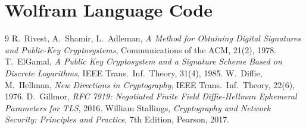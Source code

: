 \documentclass[12pt,a4paper]{article}
\begin{document}
\appendix
\section{Wolfram Language Code}\label{app:wl}


\begin{thebibliography}{9}
 R.\ Rivest, A.\ Shamir, L.\ Adleman, \emph{A Method for Obtaining Digital Signatures
  and Public-Key Cryptosystems}, Communications of the ACM, 21(2), 1978.
 T.\ ElGamal, \emph{A Public Key Cryptosystem and a Signature Scheme Based on Discrete
  Logarithms}, IEEE Trans.\ Inf.\ Theory, 31(4), 1985.
 W.\ Diffie, M.\ Hellman, \emph{New Directions in Cryptography}, IEEE Trans.\ Inf.\
  Theory, 22(6), 1976.
 D.\ Gillmor, \emph{RFC 7919: Negotiated Finite Field Diffie-Hellman Ephemeral
  Parameters for TLS}, 2016.
 William Stallings, \emph{Cryptography and Network Security: Principles and
  Practice}, 7th Edition, Pearson, 2017.
\end{thebibliography}
\end{document}

